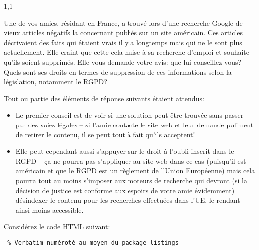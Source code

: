 \documentclass[11pt,a4paper]{exam}
\begin{document}
\begin{spacing}{1,1}
\begin{questions}
        	\question[2] Une de vos amies, résidant en France, a trouvé lors d'une recherche Google de vieux articles négatifs la concernant publiés sur un site américain. Ces articles décrivaient des faits qui étaient vrais il y a longtemps mais qui ne le sont plus actuellement. Elle craint que cette cela nuise à sa recherche d'emploi et souhaite qu'ils soient supprimés. Elle vous demande votre avis: que lui conseillez-vous? Quels sont ses droits en termes de suppression de ces informations selon la législation, notamment le RGPD?
        	\begin{solution}
        		Tout ou partie des éléments de réponse suivants étaient attendus:
        		\begin{itemize}
        			\item Le premier conseil est de voir si une solution peut être trouvée sans passer par des voies légales -- si l'amie contacte le site web et leur demande poliment de retirer le contenu, il se peut tout à fait qu'ils acceptent!
        			\item Elle peut cependant aussi s'appuyer sur le droit à l'oubli inscrit dans le RGPD -- ça ne pourra pas s'appliquer au site web dans ce cas (puisqu'il est américain et que le RGPD est un règlement de l'Union Européenne) mais cela pourra tout au moins s'imposer aux moteurs de recherche qui devront (si la décision de justice est conforme aux espoirs de votre amie évidemment) désindexer le contenu pour les recherches effectuées dans l'UE, le rendant ainsi moins accessible.
        		\end{itemize}
        	\end{solution}
        	
        	\question[3] Considérez le code HTML suivant:
        	\begin{lstlisting} % Verbatim numéroté au moyen du package listings


\end{lstlisting}
\end{questions}
\end{spacing}
\end{document}
